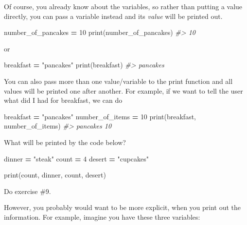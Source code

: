 \documentclass[
]{book}
\newenvironment{Shaded}{\begin{snugshade}}{\end{snugshade}}
\newcommand{\BuiltInTok}[1]{#1}
\newcommand{\CommentTok}[1]{\textcolor[rgb]{0.56,0.35,0.01}{\textit{#1}}}
\newcommand{\DecValTok}[1]{\textcolor[rgb]{0.00,0.00,0.81}{#1}}
\newcommand{\NormalTok}[1]{#1}
\newcommand{\OperatorTok}[1]{\textcolor[rgb]{0.81,0.36,0.00}{\textbf{#1}}}
\newcommand{\StringTok}[1]{\textcolor[rgb]{0.31,0.60,0.02}{#1}}
\begin{document}
Of course, you already know about the variables, so rather than putting a value directly, you can pass a variable instead and its \emph{value} will be printed out.

\begin{Shaded}
\begin{Highlighting}[]
\NormalTok{number\_of\_pancakes }\OperatorTok{=} \DecValTok{10}
\BuiltInTok{print}\NormalTok{(number\_of\_pancakes)}
\CommentTok{\#\textgreater{} 10}
\end{Highlighting}
\end{Shaded}

or

\begin{Shaded}
\begin{Highlighting}[]
\NormalTok{breakfast }\OperatorTok{=} \StringTok{"pancakes"}
\BuiltInTok{print}\NormalTok{(breakfast)}
\CommentTok{\#\textgreater{} pancakes}
\end{Highlighting}
\end{Shaded}

You can also pass more than one value/variable to the print function and all values will be printed one after another. For example, if we want to tell the user what did I had for breakfast, we can do

\begin{Shaded}
\begin{Highlighting}[]
\NormalTok{breakfast }\OperatorTok{=} \StringTok{"pancakes"}
\NormalTok{number\_of\_items }\OperatorTok{=} \DecValTok{10}
\BuiltInTok{print}\NormalTok{(breakfast, number\_of\_items)}
\CommentTok{\#\textgreater{} pancakes 10}
\end{Highlighting}
\end{Shaded}

What will be printed by the code below?

\begin{Shaded}
\begin{Highlighting}[]
\NormalTok{dinner }\OperatorTok{=} \StringTok{"steak"}
\NormalTok{count }\OperatorTok{=} \DecValTok{4}
\NormalTok{desert }\OperatorTok{=} \StringTok{"cupcakes"}

\BuiltInTok{print}\NormalTok{(count, dinner, count, desert)}
\end{Highlighting}
\end{Shaded}

Do exercise \#9.

However, you probably would want to be more explicit, when you print out the information. For example, imagine you have these three variables:
\end{document}
